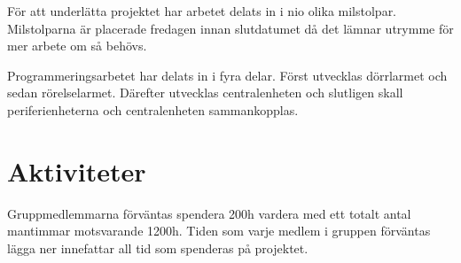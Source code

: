 \documentclass[a4paper]{article}
\begin{document}
För att underlätta projektet har arbetet delats in i nio olika milstolpar. Milstolparna är placerade fredagen innan slutdatumet då det lämnar utrymme för mer arbete om så behövs.

Programmeringsarbetet har delats in i fyra delar. Först utvecklas dörrlarmet och sedan rörelselarmet. Därefter utvecklas centralenheten och slutligen skall periferienheterna och centralenheten sammankopplas. 

\section{Aktiviteter}

Gruppmedlemmarna förväntas spendera 200h vardera med ett totalt antal mantimmar motsvarande 1200h. Tiden som varje medlem i gruppen förväntas lägga ner innefattar all tid som spenderas på projektet.
\end{document}
